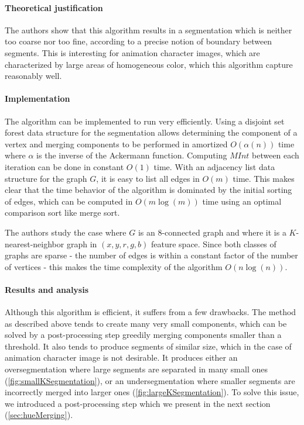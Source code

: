 \paragraph{Theoretical justification} The authors show that this algorithm results in a segmentation which is neither too coarse nor too fine, according to a precise notion of boundary between segments. This is interesting for animation character images, which are characterized by large areas of homogeneous color, which this algorithm capture reasonably well.

\paragraph{Implementation} The algorithm can be implemented to run very efficiently. Using a disjoint set forest data structure for the segmentation allows determining the component of a vertex and merging components to be performed in amortized $O(\alpha(n))$ time where $\alpha$ is the inverse of the Ackermann function. Computing $MInt$ between each iteration can be done in constant $O(1)$ time. With an adjacency list data structure for the graph $G$, it is easy to list all edges in $O(m)$ time. This makes clear that the time behavior of the algorithm is dominated by the initial sorting of edges, which can be computed in $O(m\log(m))$ time using an optimal comparison sort like merge sort.

The authors study the case where $G$ is an $8$-connected graph and where it is a $K$-nearest-neighbor graph in $(x, y, r, g, b)$ feature space. Since both classes of graphs are sparse - the number of edges is within a constant factor of the number of vertices - this makes the time complexity of the algorithm $O(n\log(n))$.

\paragraph{Results and analysis} Although this algorithm is efficient, it suffers from a few drawbacks. The method as described above tends to create many very small components, which can be solved by a post-processing step greedily merging components smaller than a threshold. It also tends to produce segments of similar size, which in the case of animation character image is not desirable. It produces either an oversegmentation where large segments are separated in many small ones (\autoref{fig:smallKSegmentation}), or an undersegmentation where smaller segments are incorrectly merged into larger ones (\autoref{fig:largeKSegmentation}). To solve this issue, we introduced a post-processing step which we present in the next section (\autoref{sec:hueMerging}).

